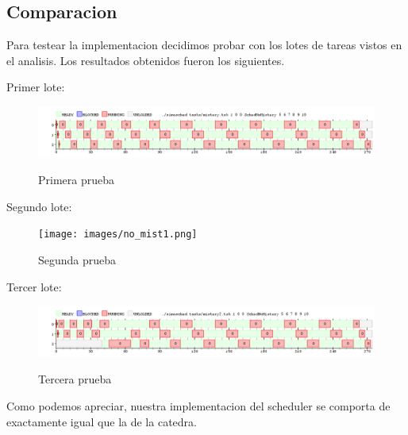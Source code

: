 \subsection{Comparacion}

Para testear la implementacion decidimos probar con los lotes de tareas vistos en el analisis. Los resultados obtenidos fueron los siguientes.

\pagebreak

Primer lote:

\begin{figure}[h]
    \includegraphics[width=\linewidth]{images/no_mist.png}
    \label{fig:Task Consola}
    \caption{Primera prueba}
\end{figure}

Segundo lote:

\begin{figure}[h]
    \texttt{[image: images/no\_mist1.png]}
    \label{fig:Task Consola}
    \caption{Segunda prueba}
\end{figure}

Tercer lote:

\begin{figure}[h]
    \includegraphics[width=\linewidth]{images/no_mist2.png}
    \label{fig:Task Consola}
    \caption{Tercera prueba}
\end{figure}

Como podemos apreciar, nuestra implementacion del scheduler se comporta de exactamente igual que la de la catedra.

